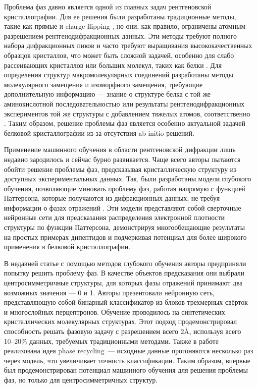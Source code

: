 Проблема фаз давно является одной из главных задач рентгеновской кристаллографии. Для ее решения были разработаны традиционные методы, такие как прямые \cite{direct} и charge-flipping \cite{charge_flipping}, но они, как правило, ограничены атомным разрешением рентгенодифракционных данных. Эти методы требуют полного набора дифракционных пиков и часто требуют выращивания высококачественных образцов кристаллов, что может быть сложной задачей, особенно для слабо рассеивающих кристаллов или больших молекул, таких как белки \cite{protein_crystallography}. Для определения структур макромолекулярных соединений разработаны методы молекулярного замещения и изоморфного замещения, требующие дополнительную информацию --- знание о структуре белка с той же аминокислотной последовательностью или результаты рентгенодифракционных экспериментов той же структуры с добавлением тяжелых атомов, соответственно \cite{acta}. Таким образом, решение проблемы фаз является особенно актуальной задачей белковой кристаллографии из-за отсутствия ab initio решений. 

Применение машинного обучения в области рентгеновской дифракции лишь недавно зародилось и сейчас бурно развивается. Чаще всего авторы пытаются обойти решение проблемы фаз, предсказывая кристаллическую структуру из доступных экспериментальных данных. Так, были разработаны модели глубокого обучения, позволяющие миновать проблему фаз, работая напрямую с функцией Паттерсона, которые получаются из дифракционных данных, не требуя информации о фазах отражений \cite{patterson}. Эти модели представляют собой сверточные нейронные сети для предсказания распределения электронной плотности структуры по функции Паттерсона, демонстрируя многообещающие результаты на простых примерах дипептидов и подчеркивая потенциал для более широкого применения в белковой кристаллографии.

В недавней статье \cite{science} с помощью методов глубокого обучения авторы предприняли попытку решить проблему фаз. В качестве объектов предсказания они выбрали центросимметричные структуры, для которых фазы отражений принимают два возможных значения --- 0 и 1. Авторы презентовали нейронную сеть, представляющую собой бинарный классификатор из блоков трехмерных свёрток и многослойных перцептронов. Обучение проводилось на синтетических кристаллических молекулярных структурах. Этот подход продемонстрировал способность решать фазовую задачу с разрешением всего 2$\text{\AA}$, используя всего 10--20$\text{\%}$ данных, требуемых традиционными методами. Также в работе реализована идея phase recycling~--- исходные данные прогоняются несколько раз через модель, что увеличивает точность классификации. Таким образом, впервые был продемонстрирован потенциал машинного обучения для решения проблемы фаз, но только для центросимметричных структур.

